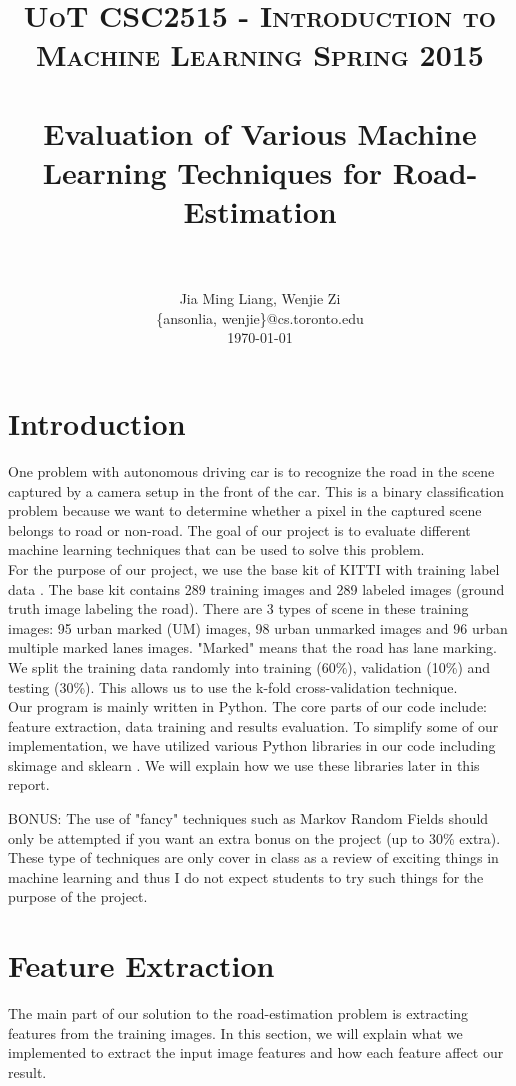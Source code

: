\documentclass[paper=letter, fontsize=11pt]{scrartcl}
\title{
		\usefont{OT1}{bch}{b}{n}
		\normalfont \normalsize \textsc{UoT CSC2515 - Introduction to Machine Learning Spring 2015} \\ [25pt]
		\horrule{0.5pt} \\[0.4cm]
		\huge Evaluation of Various Machine Learning Techniques for Road-Estimation \\
		\horrule{2pt} \\[0.5cm]
}
\author{
		\normalfont 								\normalsize
        Jia Ming Liang, Wenjie Zi\\[-3pt]		\normalsize
        \{ansonlia, wenjie\}@cs.toronto.edu\\[-3pt]		\normalsize
        \today
}
\date{}
\numberwithin{equation}{section}		%
\numberwithin{figure}{section}			%
\numberwithin{table}{section}				%
\begin{document}
\maketitle
\section{Introduction}

One problem with autonomous driving car is to recognize the road in the scene captured by a camera setup in the front of the car. This is a binary classification problem because we want to determine whether a pixel in the captured scene belongs to road or non-road. The goal of our project is to evaluate different machine learning techniques that can be used to solve this problem. \\

For the purpose of our project, we use the base kit of KITTI with training label data \cite{bib:kitti}. The base kit contains 289 training images and 289 labeled images (ground truth image labeling the road). There are 3 types of scene in these training images: 95 urban marked (UM) images, 98 urban unmarked images and 96 urban multiple marked lanes images. "Marked" means that the road has lane marking. We split the training data randomly into training (60\%), validation (10\%) and testing (30\%). This allows us to use the k-fold cross-validation technique.\\


Our program is mainly written in Python. The core parts of our code include: feature extraction, data training and results evaluation. To simplify some of our implementation, we have utilized various Python libraries in our code including skimage and sklearn \cite{bib:skimage,bib:sklearn}. We will explain how we use these libraries later in this report.

\if
BONUS: The use of "fancy" techniques such as Markov Random Fields should only be attempted if you want an extra bonus on the project (up to 30\% extra). These type of techniques are only cover in class as a review of exciting things in machine learning and thus I do not expect students to try such things for the purpose of the project.
\fi
\section{Feature Extraction}
The main part of our solution to the road-estimation problem is extracting features from the training images. In this section, we will explain what we implemented to extract the input image features and how each feature affect our result. 
\end{document}
